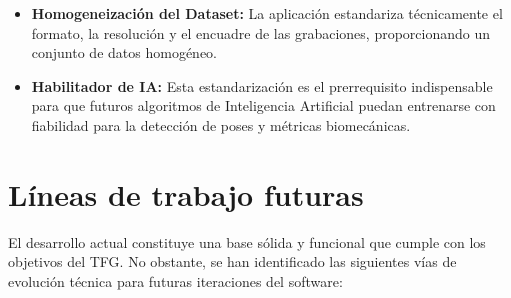 \begin{itemize}
    \item \textbf{Homogeneización del Dataset:} La aplicación estandariza técnicamente el formato, la resolución y el encuadre de las grabaciones, proporcionando un conjunto de datos homogéneo.
    \item \textbf{Habilitador de IA:} Esta estandarización es el prerrequisito indispensable para que futuros algoritmos de Inteligencia Artificial puedan entrenarse con fiabilidad para la detección de poses y métricas biomecánicas.
\end{itemize}

\section{Líneas de trabajo futuras}

El desarrollo actual constituye una base sólida y funcional que cumple con los objetivos del TFG. No obstante, se han identificado las siguientes vías de evolución técnica para futuras iteraciones del software:

